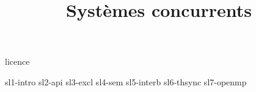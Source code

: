 \documentclass [xcolor=table] {beamer}
\title {Systèmes concurrents}
\begin{document}

 {licence}

 {sl1-intro}
 {sl2-api}
 {sl3-excl}
 {sl4-sem}
 {sl5-interb}
 {sl6-thsync}
 {sl7-openmp}
\end{document}
